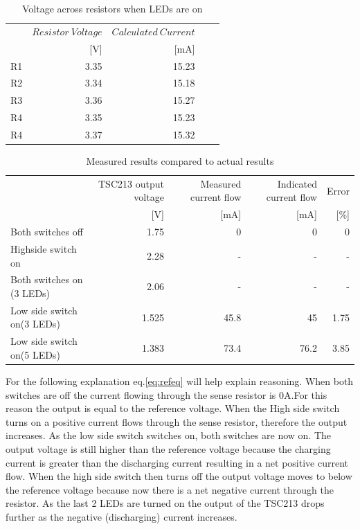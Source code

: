 \begin{table}[!htb]
        \centering
        \footnotesize
        \caption{Voltage across resistors when LEDs are on}
         \begin{tabular}{lrrrr}
          \toprule
             & $Resistor \ Voltage$ & $Calculated \ Current$ \\
             &  [V]  & [mA]\\
          \midrule
         R1      & 3.35 & 15.23 \\
          R2 & 3.34   & 15.18 \\
          R3       &3.36 & 15.27 \\
          R4        &3.35 & 15.23 \\
          R4        &3.37 &15.32 \\
          \bottomrule
        \end{tabular}
     \label{tab:resistor meas}
\end{table}



\begin{table}[!htb]
        \centering
        \footnotesize
        \caption{Measured results compared to actual results}
         \begin{tabular}{lrrrr}
          \toprule
             & TSC213 output voltage&Measured current flow & Indicated current flow& Error \\
             &   [V]&[mA]  &[mA]&[\%]\\
          \midrule
         Both switches off      & 1.75 &0 &0 &0 \\
         Highside switch on		&2.28& -& - &-\\	
         Both switches on (3 LEDs)		&2.06& -& - &-\\	
         Low side switch on(3 LEDs)     & 1.525 & 45.8&45 &1.75 \\
         Low side switch on(5 LEDs)    & 1.383 & 73.4&76.2 &3.85 \\
          
          \bottomrule
        \end{tabular}
     \label{tab:compare}
\end{table}


For the following explanation eq.\ref{eq:refeq} will help explain reasoning. When both switches are off the current flowing through the sense resistor is 0A.For this reason the output is equal to the reference voltage. When the High side switch turns on a positive current flows through the sense resistor, therefore the output increases. As the low side switch switches on, both switches are now on. The output voltage is still higher than the reference voltage because the charging current is greater than the discharging current resulting in a net positive current flow. When the high side switch then turns off the output voltage moves to below the reference voltage because now there is a net negative current through the resistor. As the last 2 LEDs are turned on the output of the TSC213 drops further as the negative (discharging) current increases.



